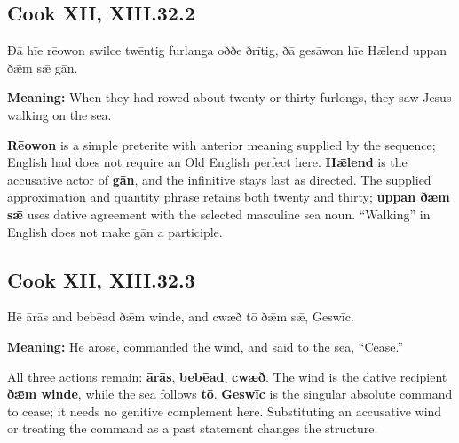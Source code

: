 \par\begin{minipage}{\linewidth}\raggedright
\subsection*{Cook XII, XIII.32.2}

Ðā hīe rēowon swilce twēntig furlanga oððe ðrītig, ðā gesāwon hīe Hǣlend uppan ðǣm sǣ gān.

\textbf{Meaning:} When they had rowed about twenty or thirty furlongs, they saw Jesus walking on the sea.

\textbf{Rēowon} is a simple preterite with anterior meaning supplied by the sequence; English had does not require an Old English perfect here. \textbf{Hǣlend} is the accusative actor of \textbf{gān}, and the infinitive stays last as directed. The supplied approximation and quantity phrase retains both twenty and thirty; \textbf{uppan ðǣm sǣ} uses dative agreement with the selected masculine sea noun. “Walking” in English does not make gān a participle.

\end{minipage}\par\addvspace{4pt}

\par\begin{minipage}{\linewidth}\raggedright
\subsection*{Cook XII, XIII.32.3}

Hē ārās and bebēad ðǣm winde, and cwæð tō ðǣm sǣ, Geswīc.

\textbf{Meaning:} He arose, commanded the wind, and said to the sea, “Cease.”

All three actions remain: \textbf{ārās}, \textbf{bebēad}, \textbf{cwæð}. The wind is the dative recipient \textbf{ðǣm winde}, while the sea follows \textbf{tō}. \textbf{Geswīc} is the singular absolute command to cease; it needs no genitive complement here. Substituting an accusative wind or treating the command as a past statement changes the structure.

\end{minipage}\par\addvspace{4pt}

